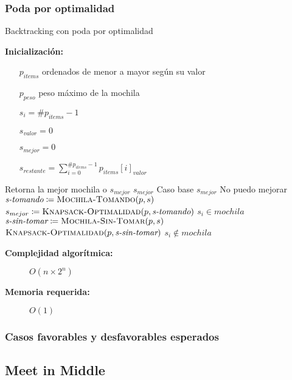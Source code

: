 \documentclass[fleqn, 11pt]{article}
\def\is{\coloneqq}
\begin{document}
\subsubsection{Poda por optimalidad}
\begin{algorithm}
\caption{Backtracking con poda por optimalidad}
\begin{algorithmic}[1]
\item[\textbf{Inicialización:}]
\item[] \begin{itemize}
	\item[] $p_{items}$ ordenados de menor a mayor según su valor
	\item[] $p_{peso}$ peso máximo de la mochila
	\item[] $s_i = \#p_{items} - 1$
	\item[] $s_{valor} = 0$
	\item[] $s_{mejor} = 0$
	\item[] $s_{restante} = \sum_{i = 0}^{\#p_{items} - 1} p_{items}[i]_{valor}$
\end{itemize}
\Statex
{}
\Comment Retorna la mejor mochila o $s_{mejor}$
	\State \Return $s_{mejor}$
	\Comment Caso base
\EndIf
{}
	\State \Return $s_{mejor}$
	\Comment No puedo mejorar
\EndIf
{}
	\State $\textit{s-tomando} \is \Call{Mochila-Tomando}{p, s}$
	\State $s_{mejor} \is \Call{Knapsack-Optimalidad}{p, \textit{s-tomando}}$
	\Comment $s_i \in mochila$
\EndIf
\State $\textit{s-sin-tomar} \is \Call{Mochila-Sin-Tomar}{p, s}$
\State \Return $\Call{Knapsack-Optimalidad}{p, \textit{s-sin-tomar}}$
\Comment $s_i \not\in mochila$
\EndFunction
\end{algorithmic}
\begin{description}
	\item[\textbf{Complejidad algorítmica:}] $O(n \times 2^n)$
	\item[\textbf{Memoria requerida:}] $O(1)$
\end{description}
\end{algorithm}

\subsubsection{Casos favorables y desfavorables esperados}

\subsection{Meet in Middle}
\end{document}
